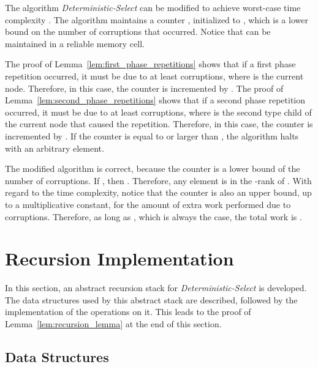 \documentclass{llncs}
\begin{document}
\begin{pf}
The algorithm \emph{Deterministic-Select} can be modified to achieve worst-case time complexity . The algorithm maintains a counter , initialized to , which is a lower bound on the number of corruptions that occurred. Notice that  can be maintained in a reliable memory cell.

The proof of Lemma~\ref{lem:first_phase_repetitions} shows that if a first phase repetition occurred, it must be due to at least  corruptions, where  is the current node. Therefore, in this case, the counter is incremented by . The proof of Lemma~\ref{lem:second_phase_repetitions} shows that if a second phase repetition occurred, it must be due to at least  corruptions, where  is the second type child of the current node that caused the repetition. Therefore, in this case, the counter is incremented by . If the counter is equal to or larger than , the algorithm halts with an arbitrary element.

\newpage
The modified algorithm is correct, because the counter is a lower bound of the number of corruptions. If , then . Therefore, any element is in the -rank of . With regard to the time complexity, notice that the counter is also an upper bound, up to a multiplicative constant, for the amount of extra work performed due to corruptions. Therefore, as long as , which is always the case, the total work is .
\end{pf}















\section{Recursion Implementation}
\label{sec:recursion_implementation}

In this section, an abstract recursion stack for \emph{Deterministic-Select} is developed. The data structures used by this abstract stack are described, followed by the implementation of the operations on it. This leads to the proof of Lemma~\ref{lem:recursion_lemma} at the end of this section.

\subsection{Data Structures}
\label{subsec:recursion_data_structures}
\end{document}
